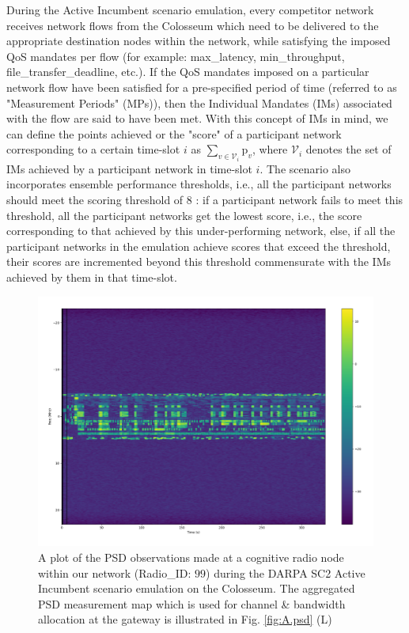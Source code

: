 \documentclass[12pt, draftcls, onecolumn]{IEEEtran}
\begin{document}
During the Active Incumbent scenario emulation, every competitor network receives network flows from the Colosseum which need to be delivered to the appropriate destination nodes within the network, while satisfying the imposed QoS mandates per flow (for example: max\_latency, min\_throughput, file\_transfer\_deadline, etc.). If the QoS mandates imposed on a particular network flow have been satisfied for a pre-specified period of time (referred to as "Measurement Periods" (MPs)), then the Individual Mandates (IMs) associated with the flow are said to have been met. With this concept of IMs in mind, we can define the points achieved or the "score" of a participant network corresponding to a certain time-slot $i$ as $\sum_{v{\in}\mathcal{V}_{i}} \text{p}_{v}$, where $\mathcal{V}_{i}$ denotes the set of IMs achieved by a participant network in time-slot $i$. The scenario also incorporates ensemble performance thresholds, i.e., all the participant networks should meet the scoring threshold of $8$ \cite{DARPA:ActiveIncumbent}: if a participant network fails to meet this threshold, all the participant networks get the lowest score, i.e., the score corresponding to that achieved by this under-performing network, else, if all the participant networks in the emulation achieve scores that exceed the threshold, their scores are incremented beyond this threshold commensurate with the IMs achieved by them in that time-slot.
\begin{figure} [htb]
    \centerline{
    \includegraphics[width = 0.8\linewidth]{figures/PSD_Observations_Active_Incumbent.png}}
    \caption{A plot of the PSD observations made at a cognitive radio node within our network (Radio\_ID: $99$) during the DARPA SC2 Active Incumbent scenario emulation on the Colosseum. The aggregated PSD measurement map which is used for channel \& bandwidth allocation at the gateway is illustrated in Fig. \ref{fig:A.psd} (L)}
    \label{fig: Y. 3}
\end{figure}
\end{document}
